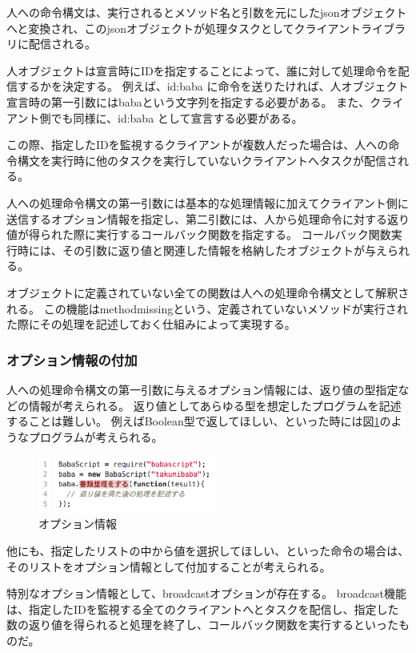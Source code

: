 人への命令構文は、実行されるとメソッド名と引数を元にしたjsonオブジェクトへと変換され、このjsonオブジェクトが処理タスクとしてクライアントライブラリに配信される。

人オブジェクトは宣言時にIDを指定することによって、誰に対して処理命令を配信するかを決定する。
例えば、id:baba
に命令を送りたければ、人オブジェクト宣言時の第一引数にはbabaという文字列を指定する必要がある。
また、クライアント側でも同様に、id:baba として宣言する必要がある。

この際、指定したIDを監視するクライアントが複数人だった場合は、人への命令構文を実行時に他のタスクを実行していないクライアントへタスクが配信される。

人への処理命令構文の第一引数には基本的な処理情報に加えてクライアント側に送信するオプション情報を指定し、第二引数には、人から処理命令に対する返り値が得られた際に実行するコールバック関数を指定する。
コールバック関数実行時には、その引数に返り値と関連した情報を格納したオブジェクトが与えられる。

オブジェクトに定義されていない全ての関数は人への処理命令構文として解釈される。
この機能はmethodmissingという、定義されていないメソッドが実行された際にその処理を記述しておく仕組みによって実現する。

\subsubsection{オプション情報の付加}\label{ux30aaux30d7ux30b7ux30e7ux30f3ux60c5ux5831ux306eux4ed8ux52a0}

人への処理命令構文の第一引数に与えるオプション情報には、返り値の型指定などの情報が考えられる。
返り値としてあらゆる型を想定したプログラムを記述することは難しい。
例えばBoolean型で返してほしい、といった時には図\ref{script_02}のようなプログラムが考えられる。

\begin{figure}[h]
  \centering
  \includegraphics[width=220px]{./images/script_02.png}
  \caption{オプション情報}
  \label{script_02}
\end{figure}

他にも、指定したリストの中から値を選択してほしい、といった命令の場合は、そのリストをオプション情報として付加することが考えられる。

特別なオプション情報として、broadcastオプションが存在する。
broadcast機能は、指定したIDを監視する全てのクライアントへとタスクを配信し、指定した数の返り値を得られると処理を終了し、コールバック関数を実行するといったものだ。

